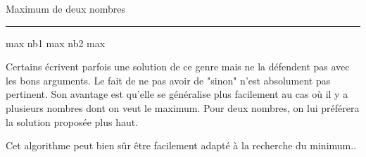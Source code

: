 \begin{Fiche}{Maximum de deux nombres}
	\hfil\rule{0.5\textwidth}{.4pt}\hfil

	\begin{minipage}{7.0cm}
		\begin{LDA}
			\Let max \Gets nb1
				\Let max \Gets nb2
			\EndIf
			\Return max
		\EndAlgo
		\end{LDA}
	\end{minipage}
	\quad
	\begin{minipage}{6.5cm}
		Certains écrivent parfois une solution de ce genre
		mais ne la défendent pas avec les bons arguments.
		Le fait de ne pas avoir de "sinon" n'est absolument pas pertinent.
		Son avantage est qu'elle se généralise plus facilement
		au cas où il y a plusieurs nombres dont on veut le maximum.
		Pour deux nombres, on lui préférera la solution proposée plus haut.
	\end{minipage}
	

	Cet algorithme peut bien sûr être facilement adapté
	à la recherche du minimum..
		
\end{Fiche}
